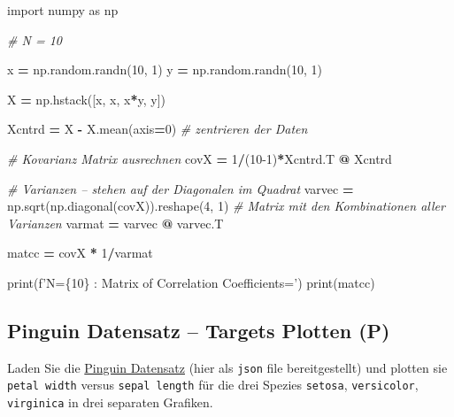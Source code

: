 \documentclass[]{book}
\newenvironment{Shaded}{\begin{snugshade}}{\end{snugshade}}
\newcommand{\BuiltInTok}[1]{#1}
\newcommand{\CommentTok}[1]{\textcolor[rgb]{0.56,0.35,0.01}{\textit{#1}}}
\newcommand{\DecValTok}[1]{\textcolor[rgb]{0.00,0.00,0.81}{#1}}
\newcommand{\ImportTok}[1]{#1}
\newcommand{\NormalTok}[1]{#1}
\newcommand{\OperatorTok}[1]{\textcolor[rgb]{0.81,0.36,0.00}{\textbf{#1}}}
\newcommand{\SpecialCharTok}[1]{\textcolor[rgb]{0.00,0.00,0.00}{#1}}
\newcommand{\SpecialStringTok}[1]{\textcolor[rgb]{0.31,0.60,0.02}{#1}}
\theoremstyle{definition}
\theoremstyle{definition}
\theoremstyle{definition}
\theoremstyle{definition}
\theoremstyle{remark}
\begin{document}
\begin{Shaded}
\begin{Highlighting}[]
\ImportTok{import}\NormalTok{ numpy }\ImportTok{as}\NormalTok{ np}

\CommentTok{# N = 10}

\NormalTok{x }\OperatorTok{=}\NormalTok{ np.random.randn(}\DecValTok{10}\NormalTok{, }\DecValTok{1}\NormalTok{)}
\NormalTok{y }\OperatorTok{=}\NormalTok{ np.random.randn(}\DecValTok{10}\NormalTok{, }\DecValTok{1}\NormalTok{)}

\NormalTok{X }\OperatorTok{=}\NormalTok{ np.hstack([x, x, x}\OperatorTok{*}\NormalTok{y, y])}

\NormalTok{Xcntrd }\OperatorTok{=}\NormalTok{ X }\OperatorTok{-}\NormalTok{ X.mean(axis}\OperatorTok{=}\DecValTok{0}\NormalTok{)}
\CommentTok{# zentrieren der Daten}

\CommentTok{# Kovarianz Matrix ausrechnen}
\NormalTok{covX }\OperatorTok{=} \DecValTok{1}\OperatorTok{/}\NormalTok{(}\DecValTok{10-1}\NormalTok{)}\OperatorTok{*}\NormalTok{Xcntrd.T }\OperatorTok{@}\NormalTok{ Xcntrd}

\CommentTok{# Varianzen -- stehen auf der Diagonalen im Quadrat}
\NormalTok{varvec }\OperatorTok{=}\NormalTok{ np.sqrt(np.diagonal(covX)).reshape(}\DecValTok{4}\NormalTok{, }\DecValTok{1}\NormalTok{)}
\CommentTok{# Matrix mit den Kombinationen aller Varianzen}
\NormalTok{varmat }\OperatorTok{=}\NormalTok{ varvec }\OperatorTok{@}\NormalTok{ varvec.T}

\NormalTok{matcc }\OperatorTok{=}\NormalTok{ covX }\OperatorTok{*} \DecValTok{1}\OperatorTok{/}\NormalTok{varmat}

\BuiltInTok{print}\NormalTok{(}\SpecialStringTok{f'N=}\SpecialCharTok{\{}\DecValTok{10}\SpecialCharTok{\}}\SpecialStringTok{ : Matrix of Correlation Coefficients='}\NormalTok{)}
\BuiltInTok{print}\NormalTok{(matcc)}
\end{Highlighting}
\end{Shaded}

\hypertarget{pinguin-datensatz-targets-plotten-p}{%
\subsection{Pinguin Datensatz -- Targets Plotten (P)}\label{pinguin-datensatz-targets-plotten-p}}

Laden Sie die \href{bilder/penguin-data.json}{Pinguin Datensatz} (hier als \texttt{json} file bereitgestellt) und plotten sie \texttt{petal\ width} versus \texttt{sepal\ length} für die drei Spezies \texttt{setosa}, \texttt{versicolor}, \texttt{virginica} in drei separaten Grafiken.
\end{document}
